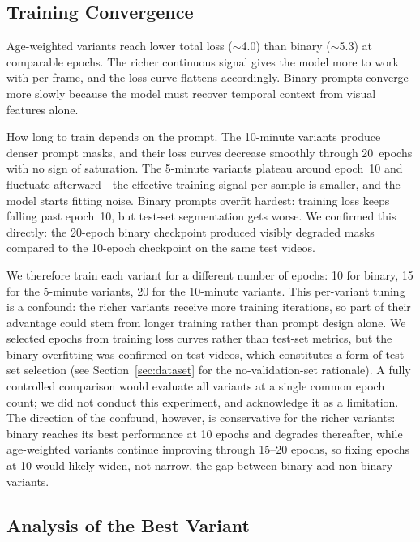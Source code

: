 \documentclass[review]{elsarticle}
\begin{document}
\subsection{Training Convergence}
\label{sec:training}

Age-weighted variants reach lower total loss ($\sim$4.0) than binary ($\sim$5.3) at comparable epochs. The richer continuous signal gives the model more to work with per frame, and the loss curve flattens accordingly. Binary prompts converge more slowly because the model must recover temporal context from visual features alone.

How long to train depends on the prompt. The 10-minute variants produce denser prompt masks, and their loss curves decrease smoothly through 20~epochs with no sign of saturation. The 5-minute variants plateau around epoch~10 and fluctuate afterward---the effective training signal per sample is smaller, and the model starts fitting noise. Binary prompts overfit hardest: training loss keeps falling past epoch~10, but test-set segmentation gets worse. We confirmed this directly: the 20-epoch binary checkpoint produced visibly degraded masks compared to the 10-epoch checkpoint on the same test videos.

We therefore train each variant for a different number of epochs: 10 for binary, 15 for the 5-minute variants, 20 for the 10-minute variants. This per-variant tuning is a confound: the richer variants receive more training iterations, so part of their advantage could stem from longer training rather than prompt design alone. We selected epochs from training loss curves rather than test-set metrics, but the binary overfitting was confirmed on test videos, which constitutes a form of test-set selection (see Section~\ref{sec:dataset} for the no-validation-set rationale). A fully controlled comparison would evaluate all variants at a single common epoch count; we did not conduct this experiment, and acknowledge it as a limitation. The direction of the confound, however, is conservative for the richer variants: binary reaches its best performance at 10 epochs and degrades thereafter, while age-weighted variants continue improving through 15--20 epochs, so fixing epochs at 10 would likely widen, not narrow, the gap between binary and non-binary variants.

\subsection{Analysis of the Best Variant}
\end{document}
